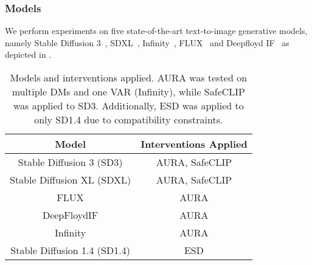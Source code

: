 \subsubsection{Models}
We perform experiments on five state-of-the-art text-to-image generative models, namely Stable Diffusion 3~\citep{esser2024scalingSD3}, SDXL~\citep{podell2023sdxl}, Infinity~\citep{han2024infinity}, FLUX~\citep{flux} and Deepfloyd IF~\citep{DeepFloydIF} as depicted in .

\begin{table}[h!]
    \centering
    \begin{tabular}{cc}
        \toprule
        \textbf{Model} & \textbf{Interventions Applied} \\
        \midrule
        Stable Diffusion 3 (SD3) & AURA, SafeCLIP \\
        Stable Diffusion XL (SDXL) & AURA, SafeCLIP \\
        FLUX & AURA \\
        DeepFloydIF & AURA \\
        Infinity & AURA \\
        Stable Diffusion 1.4 (SD1.4) & ESD \\
        \bottomrule
    \end{tabular}
    \caption{Models and interventions applied. AURA was tested on multiple DMs and one VAR (Infinity), while SafeCLIP was applied to SD3. Additionally, ESD was applied to only SD1.4 due to compatibility constraints.}
    \label{tab:models_interventions}
\end{table}


